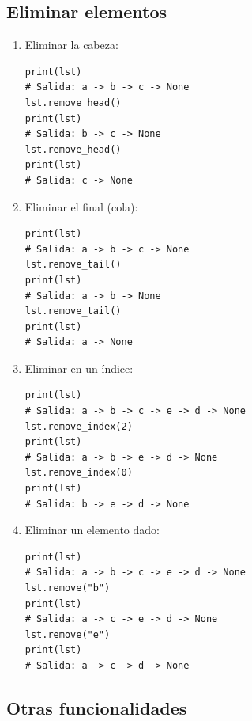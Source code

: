 \documentclass[10pt,a4paper]{article}
\begin{document}
\newpage

\subsection*{Eliminar elementos}

\begin{enumerate}
	\item Eliminar la cabeza:
\begin{lstlisting}
print(lst)
# Salida: a -> b -> c -> None
lst.remove_head()
print(lst)
# Salida: b -> c -> None
lst.remove_head()
print(lst)
# Salida: c -> None
\end{lstlisting}
	\item Eliminar el final (cola):
\begin{lstlisting}
print(lst)
# Salida: a -> b -> c -> None
lst.remove_tail()
print(lst)
# Salida: a -> b -> None
lst.remove_tail()
print(lst)
# Salida: a -> None
\end{lstlisting}
	\item Eliminar en un índice:
\begin{lstlisting}
print(lst)
# Salida: a -> b -> c -> e -> d -> None
lst.remove_index(2)
print(lst)
# Salida: a -> b -> e -> d -> None
lst.remove_index(0)
print(lst)
# Salida: b -> e -> d -> None
\end{lstlisting}
	\item Eliminar un elemento dado:
\begin{lstlisting}
print(lst)
# Salida: a -> b -> c -> e -> d -> None
lst.remove("b")
print(lst)
# Salida: a -> c -> e -> d -> None
lst.remove("e")
print(lst)
# Salida: a -> c -> d -> None
\end{lstlisting}
\end{enumerate}

\newpage

\subsection*{Otras funcionalidades}
\end{document}
